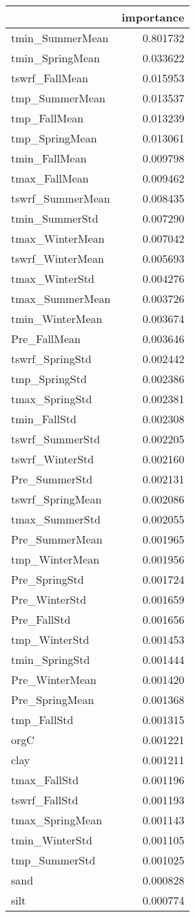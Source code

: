 \begin{tabular}{lr}
\toprule
 & importance \\
\midrule
tmin_SummerMean & 0.801732 \\
tmin_SpringMean & 0.033622 \\
tswrf_FallMean & 0.015953 \\
tmp_SummerMean & 0.013537 \\
tmp_FallMean & 0.013239 \\
tmp_SpringMean & 0.013061 \\
tmin_FallMean & 0.009798 \\
tmax_FallMean & 0.009462 \\
tswrf_SummerMean & 0.008435 \\
tmin_SummerStd & 0.007290 \\
tmax_WinterMean & 0.007042 \\
tswrf_WinterMean & 0.005693 \\
tmax_WinterStd & 0.004276 \\
tmax_SummerMean & 0.003726 \\
tmin_WinterMean & 0.003674 \\
Pre_FallMean & 0.003646 \\
tswrf_SpringStd & 0.002442 \\
tmp_SpringStd & 0.002386 \\
tmax_SpringStd & 0.002381 \\
tmin_FallStd & 0.002308 \\
tswrf_SummerStd & 0.002205 \\
tswrf_WinterStd & 0.002160 \\
Pre_SummerStd & 0.002131 \\
tswrf_SpringMean & 0.002086 \\
tmax_SummerStd & 0.002055 \\
Pre_SummerMean & 0.001965 \\
tmp_WinterMean & 0.001956 \\
Pre_SpringStd & 0.001724 \\
Pre_WinterStd & 0.001659 \\
Pre_FallStd & 0.001656 \\
tmp_WinterStd & 0.001453 \\
tmin_SpringStd & 0.001444 \\
Pre_WinterMean & 0.001420 \\
Pre_SpringMean & 0.001368 \\
tmp_FallStd & 0.001315 \\
orgC & 0.001221 \\
clay & 0.001211 \\
tmax_FallStd & 0.001196 \\
tswrf_FallStd & 0.001193 \\
tmax_SpringMean & 0.001143 \\
tmin_WinterStd & 0.001105 \\
tmp_SummerStd & 0.001025 \\
sand & 0.000828 \\
silt & 0.000774 \\
\bottomrule
\end{tabular}

